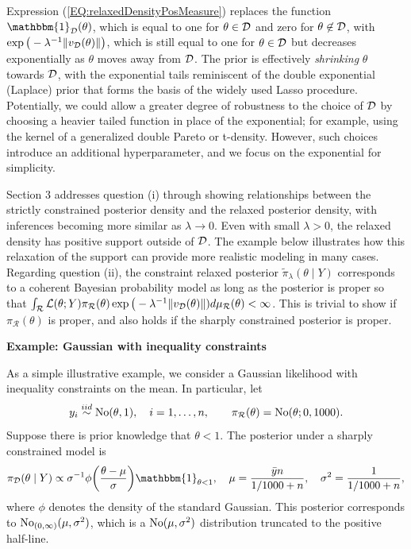 \documentclass[10pt,fleqn]{article}
\DeclareMathOperator{\1}{\mathbbm{1}} \DeclareMathOperator{\bigO}{\mc O}
\begin{document}
Expression (\ref{EQ:relaxedDensityPosMeasure}) replaces the function $\mathbbm{1}_\mathcal{D}(\theta)$, which is equal to one for $\theta \in \mathcal{D}$ and zero for $\theta \not \in \mathcal{D}$, with 
$\exp\big(-{\lambda^{-1}}{\|v_{\mathcal{D}}(\theta)\|}\big)$, which is still equal to one for $\theta \in \mathcal{D}$ but decreases exponentially as $\theta$ moves away from $\mathcal{D}$.  The prior is effectively {\em shrinking} 
$\theta$ towards $\mathcal{D}$, with the exponential tails reminiscent of the double exponential (Laplace) prior that forms the basis of the widely used Lasso procedure.  Potentially, we could allow a greater degree of robustness to the choice of $\mathcal{D}$ by choosing a heavier tailed function in place of the exponential; for example, using the kernel of a generalized double Pareto or t-density.  However, such choices introduce an additional hyperparameter, and we focus on the exponential for simplicity.

Section 3 addresses question (i) through showing relationships between the strictly constrained posterior density and the relaxed posterior density, with inferences becoming more similar as $\lambda \to 0$.  Even with small $\lambda>0$, the relaxed density has positive support outside of $\mathcal{D}$.  The example below illustrates how this relaxation of the support can provide more realistic modeling in many cases.  Regarding question (ii), the constraint relaxed posterior $\tilde{\pi}_\lambda(\theta \mid Y)$ corresponds to a coherent Bayesian probability model as long as the posterior is proper so that 
$\int_{\mathcal{R}} \mathcal{L}(\theta;Y)\pi_\mathcal{R}(\theta)\exp\big(-\lambda^{-1}{\|v_{\mathcal{D}}(\theta) \|}) d\mu_\mathcal{R}(\theta)< \infty$.  This is trivial to show if $\pi_\mathcal{R}(\theta)$ is proper, and also 
holds if the sharply constrained posterior is proper.


{\noindent \textbf{Example: Gaussian with inequality constraints}}

As a simple illustrative example, we consider a Gaussian likelihood with inequality constraints on the mean.
In particular, let 
 $$y_i \stackrel{iid}{\sim} \operatorname{No}(\theta,1),\quad i =1,\ldots,n, \qquad \pi_\mathcal{R}(\theta) =\operatorname{No}(\theta; 0, 1000).$$ 
Suppose there is prior knowledge that $\theta<1$. The posterior under a sharply constrained model is
$$ \pi_{\mc D}(\theta \mid Y) \propto {\sigma^{-1}}\phi\bigg(\frac{\theta- \mu}{\sigma}\bigg) \mathbbm{1}_{\theta<1}, \quad \mu=    \frac{ \bar yn}{ 1/1000 + n },   \quad \sigma^2 = \frac{1}{ 1/1000 + n },$$
where $\phi$ denotes the density of the standard Gaussian. This posterior corresponds to 
$\operatorname{No}_{(0,\infty)}(\mu,\sigma^2)$, which is a $\operatorname{No}(\mu,\sigma^2)$ distribution truncated to the positive half-line.
\end{document}
